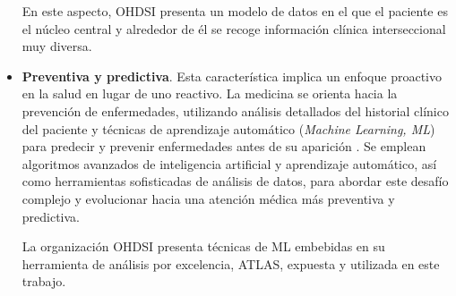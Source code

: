 \begin{itemize}
En este aspecto, OHDSI presenta un modelo de datos en el que el paciente es el núcleo central y alrededor de él se recoge información clínica interseccional muy diversa.




\item \textbf{Preventiva y predictiva}. Esta característica implica un enfoque proactivo en la salud en lugar de uno reactivo. La medicina se orienta hacia la prevención de enfermedades, utilizando análisis detallados del historial clínico del paciente y técnicas de aprendizaje automático (\textit{Machine Learning, ML}) para predecir y prevenir enfermedades antes de su aparición \parencite{ruiz2023inteligencia}. Se emplean algoritmos avanzados de inteligencia artificial y aprendizaje automático, así como herramientas sofisticadas de análisis de datos, para abordar este desafío complejo y evolucionar hacia una atención médica más preventiva y predictiva.

La organización OHDSI presenta técnicas de ML embebidas en su herramienta de análisis por excelencia, ATLAS, expuesta y utilizada en este trabajo.


\end{itemize}
